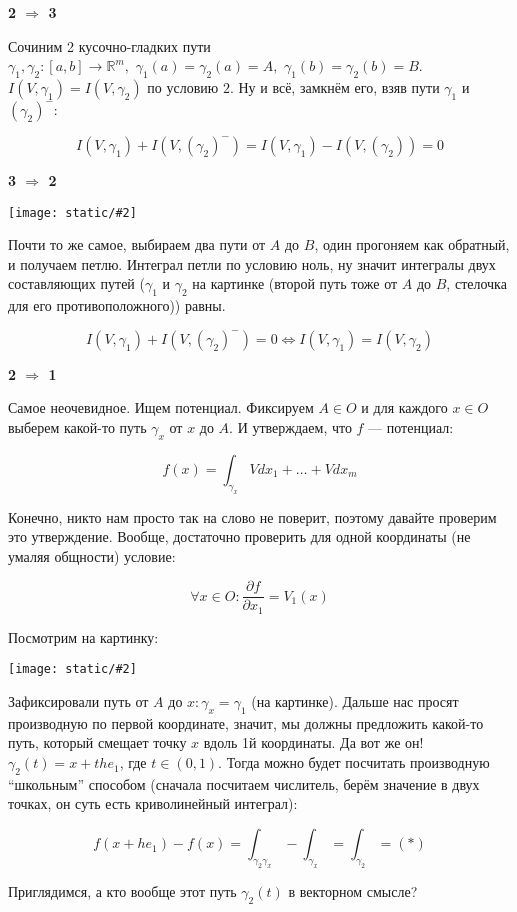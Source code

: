 \documentclass{article}
\def\dbl{\,\,}
\def\images#1#2{\begin{center}\texttt{[image: static/\#2]}\end{center}}
\begin{document}
\textbf{2 $\Rightarrow$ 3}

Сочиним 2 кусочно-гладких пути $\gamma_1, \gamma_2: [a, b] \rightarrow \mathbb{R}^m, \dbl \gamma_1(a) = \gamma_2(a) = A, \dbl \gamma_1(b) = \gamma_2(b) = B$. $I(V, \gamma_1) = I(V, \gamma_2)$ по условию $2$. Ну и всё, замкнём его, взяв пути $\gamma_1$ и $(\gamma_2)^-$:

\[I(V, \gamma_1) + I(V, (\gamma_2)^-) = I(V, \gamma_1) - I(V, (\gamma_2)) = 0\]

\textbf{3 $\Rightarrow$ 2}

\images{0.3}{harakt_pot_vp_1.jpg}

Почти то же самое, выбираем два пути от $A$ до $B$, один прогоняем как обратный, и получаем петлю. Интеграл петли по условию ноль, ну значит интегралы двух составляющих путей ($\gamma_1$ и $\gamma_2$ на картинке (второй путь тоже от $A$ до $B$, стелочка для его противоположного)) равны.

\[I(V, \gamma_1) + I(V, (\gamma_2)^-) = 0 \Leftrightarrow I(V, \gamma_1) = I(V, \gamma_2)\]

\textbf{2 $\Rightarrow$ 1}

Самое неочевидное. Ищем потенциал. Фиксируем $A \in O$ и для каждого $x \in O$ выберем какой-то путь $\gamma_x$ от $x$ до $A$. И утверждаем, что $f$ --- потенциал:

\[f(x) = \int_{\gamma_x} Vdx_1 + \ldots + Vdx_m\]

Конечно, никто нам просто так на слово не поверит, поэтому давайте проверим это утверждение. Вообще, достаточно проверить для одной координаты (не умаляя общности) условие:

\[\forall x \in O : \frac{\partial f}{\partial x_1} = V_1(x)\]

Посмотрим на картинку:

\images{0.5}{harakt_pot_vp_2.jpg}

Зафиксировали путь от $A$ до $x: \gamma_x = \gamma_1$ (на картинке). Дальше нас просят производную по первой координате, значит, мы должны предложить какой-то путь, который смещает точку $x$ вдоль 1й координаты. Да вот же он! $\gamma_2(t) = x + the_1$, где $t \in (0, 1)$. Тогда можно будет посчитать производную ``школьным'' способом (сначала посчитаем числитель, берём значение в двух точках, он суть есть криволинейный интеграл):

\[f(x + he_1) - f(x) = \int_{\gamma_2\gamma_x} - \int_{\gamma_x} = \int_{\gamma_2} = (*)\]

Приглядимся, а кто вообще этот путь $\gamma_2(t)$ в векторном смысле?
\end{document}
